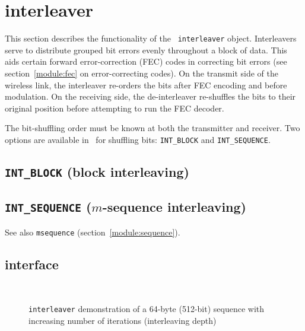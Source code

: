 % 
%

\section{interleaver}
\label{module:interleaver}

This section describes the functionality of the \liquid\
{\tt interleaver} object.
Interleavers serve to distribute grouped bit errors evenly throughout a block
of data.
This aids certain forward error-correction (FEC) codes in correcting
bit errors (see section~\ref{module:fec} on error-correcting codes).
On the transmit side of the wireless link, the interleaver re-orders the bits
after FEC encoding and before modulation.
On the receiving side, the de-interleaver re-shuffles the bits to their
original position before attempting to run the FEC decoder.


The bit-shuffling order must be known at both the transmitter and receiver.
Two options are available in \liquid\ for shuffling bits:
{\tt INT\_BLOCK} and {\tt INT\_SEQUENCE}.

\subsection{{\tt INT\_BLOCK} (block interleaving)}
\label{module:interleaver:block}

\subsection{{\tt INT\_SEQUENCE} ($m$-sequence interleaving)}
\label{module:interleaver:sequence}
See also {\tt msequence} (section~\ref{module:sequence}).

\subsection{interface}
\label{module:interleaver:interface}

\begin{figure}
\centering
\mbox{
   \quad
   \quad
}
\mbox{
   \quad
   \quad
}
\caption{{\tt interleaver} demonstration of a 64-byte (512-bit) sequence with
increasing number of iterations (interleaving depth)}
\label{fig:module:interleaver:scatterplot}
\end{figure}


